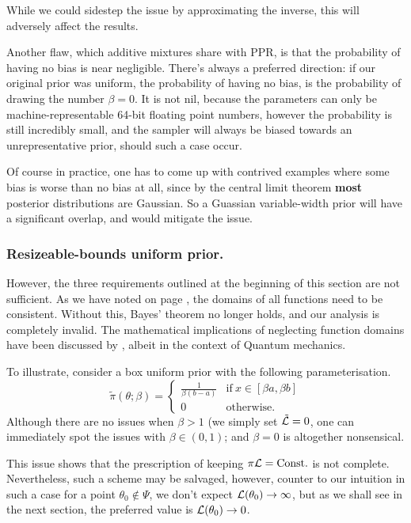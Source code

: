 \documentclass[usenatbib]{mnras}
\begin{document}
While we could sidestep the issue by approximating the inverse,
this will adversely affect the results.

Another flaw, which additive mixtures share with PPR, is that the
probability of having no bias is near negligible. There's always a
preferred direction: if our original prior was uniform, the
probability of having no bias, is the probability of drawing the
number \(\beta=0\). It is not nil, because the parameters can only
be machine-representable 64-bit floating point numbers, however
the probability is still incredibly small, and the sampler will
always be biased towards an unrepresentative prior, should such a
case occur.

Of course in practice, one has to come up with contrived examples
where some bias is worse than no bias at all, since by the central
limit theorem \textbf{most} posterior distributions are Gaussian. So a
Guassian variable-width prior will have a significant overlap, and
would mitigate the issue.

\subsubsection{Resizeable-bounds uniform prior.}
\label{sec:org0e04538}

However, the three requirements outlined at the beginning of this
section are not sufficient. As we have noted on 
page \pageref{domain-discussion}, the domains of all functions need to be
consistent. Without this, Bayes' theorem no longer holds, and our
analysis is completely invalid. The mathematical implications of
neglecting function domains have been discussed by
\cite{Gieres_2000}, albeit in the context of Quantum mechanics.  

To illustrate, consider a box uniform prior
with the following parameterisation.
\begin{equation}
  \tilde{\pi}(\theta; \beta) =
  \begin{cases}
	\frac{1}{\beta(b-a)} & \text{if}\ x \in [\beta a, \beta b] \\
	0 & \text{otherwise}.
  \end{cases}
\end{equation}
Although there are no issues when \(\beta>1\) (we simply set \({\cal
	\tilde{L}}=0\), one can immediately spot the issues with \(\beta \in (0,1)\);
and \(\beta=0\) is altogether nonsensical.

This issue shows that the prescription of keeping \(\pi {\cal L} =
	\text{Const.}\) is not complete. Nevertheless, such a scheme may be
salvaged, however, counter to our intuition in such a case for a
point \(\theta_{0} \notin \Psi\), we don't expect \({\cal L}(\theta_{0})
	\rightarrow \infty\), but as we shall see in the next section, the preferred value
is \({\cal L}(\theta_{0}) \rightarrow 0\).
\end{document}
